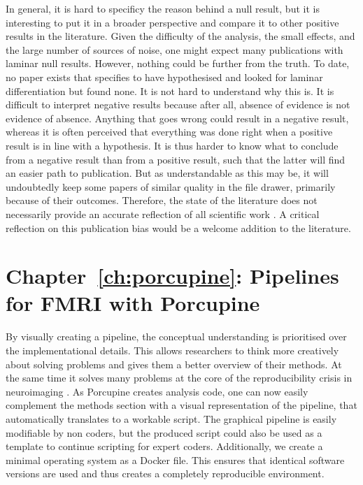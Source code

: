 In general, it is hard to specificy the reason behind a null result, but it is interesting to put it in a broader perspective and compare it to other positive results in the literature. Given the difficulty of the analysis, the small effects, and the large number of sources of noise, one might expect many publications with laminar null results. However, nothing could be further from the truth. To date, no paper exists that specifies to have hypothesised and looked for laminar differentiation but found none. 
It is not hard to understand why this is. It is difficult to interpret negative results because after all, absence of evidence is not evidence of absence. Anything that goes wrong could result in a negative result, whereas it is often perceived that everything was done right when a positive result is in line with a hypothesis. It is thus harder to know what to conclude from a negative result than from a positive result, such that the latter will find an easier path to publication. But as understandable as this may be, it will undoubtedly keep some papers of similar quality in the file drawer, primarily because of their outcomes. Therefore, the state of the literature does not necessarily provide an accurate reflection of all scientific work \cite{Ioannidis2005,Button2013}. A critical reflection on this publication bias would be a welcome addition to the literature.

\section*{Chapter~\ref{ch:porcupine}: Pipelines for FMRI with Porcupine}
By visually creating a pipeline, the conceptual understanding is prioritised over the implementational details. This allows researchers to think more creatively about solving problems and gives them a better overview of their methods. At the same time it solves many problems at the core of the reproducibility crisis in neuroimaging \cite{Nature2017,Munafo2017}. As Porcupine creates analysis code, one can now easily complement the methods section with a visual representation of the pipeline, that automatically translates to a workable script. The graphical pipeline is easily modifiable by non coders, but the produced script could also be used as a template to continue scripting for expert coders. Additionally, we create a minimal operating system as a Docker file. This ensures that identical software versions are used and thus creates a completely reproducible environment.

